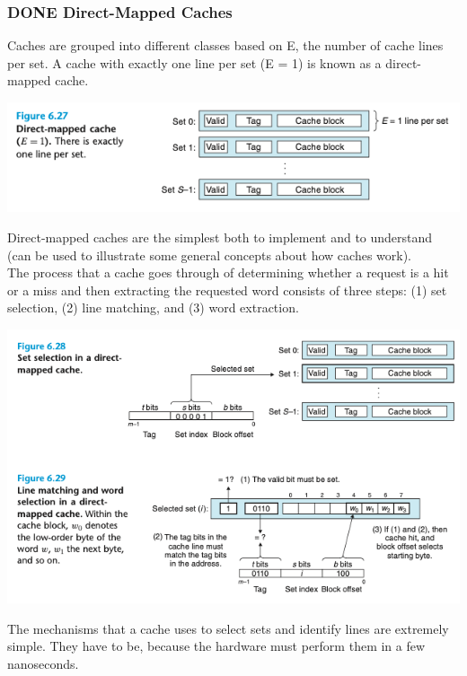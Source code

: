 \documentclass[11pt]{article}
\begin{document}
\subsubsection{{\bfseries\sffamily DONE} Direct-Mapped Caches}
\label{sec:org72edbea}
Caches are grouped into different classes based on E, the number of cache lines per set. A cache with exactly one line per set (E = 1) is known as a direct-mapped cache.\\

\begin{center}
\includegraphics[width=.9\linewidth]{pics/figure6.27-direct-mapped-cache.png}
\end{center}

Direct-mapped caches are the simplest both to implement and to understand (can be used to illustrate some general concepts about how caches work).\\


The process that a cache goes through of determining whether a request is a hit or a miss and then extracting the requested word consists of three steps: (1) set selection, (2) line matching, and (3) word extraction.\\

\begin{center}
\includegraphics[width=.9\linewidth]{pics/figure6.28-6.29-cache-request.png}
\end{center}

The mechanisms that a cache uses to select sets and identify lines are extremely simple. They have to be, because the hardware must perform them in a few nanoseconds.\\
\end{document}
